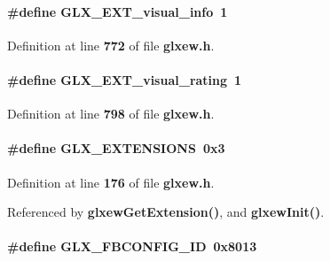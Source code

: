 \paragraph[{G\+L\+X\+\_\+\+E\+X\+T\+\_\+visual\+\_\+info}]{\setlength{\rightskip}{0pt plus 5cm}\#define G\+L\+X\+\_\+\+E\+X\+T\+\_\+visual\+\_\+info~1}\label{glxew_8h_a1c82db236ce6cd52e1c88b7a96fcb8d9}


Definition at line {\bf 772} of file {\bf glxew.\+h}.

\paragraph[{G\+L\+X\+\_\+\+E\+X\+T\+\_\+visual\+\_\+rating}]{\setlength{\rightskip}{0pt plus 5cm}\#define G\+L\+X\+\_\+\+E\+X\+T\+\_\+visual\+\_\+rating~1}\label{glxew_8h_ae22da29cd04eeae957e3afbd85da40d4}


Definition at line {\bf 798} of file {\bf glxew.\+h}.

\paragraph[{G\+L\+X\+\_\+\+E\+X\+T\+E\+N\+S\+I\+O\+NS}]{\setlength{\rightskip}{0pt plus 5cm}\#define G\+L\+X\+\_\+\+E\+X\+T\+E\+N\+S\+I\+O\+NS~0x3}\label{glxew_8h_a5aaab2c7372549a54b856e8438215db8}


Definition at line {\bf 176} of file {\bf glxew.\+h}.



Referenced by {\bf glxew\+Get\+Extension()}, and {\bf glxew\+Init()}.

\paragraph[{G\+L\+X\+\_\+\+F\+B\+C\+O\+N\+F\+I\+G\+\_\+\+ID}]{\setlength{\rightskip}{0pt plus 5cm}\#define G\+L\+X\+\_\+\+F\+B\+C\+O\+N\+F\+I\+G\+\_\+\+ID~0x8013}\label{glxew_8h_ac27348d36dd5c4a0de9c3ca633caf33e}


